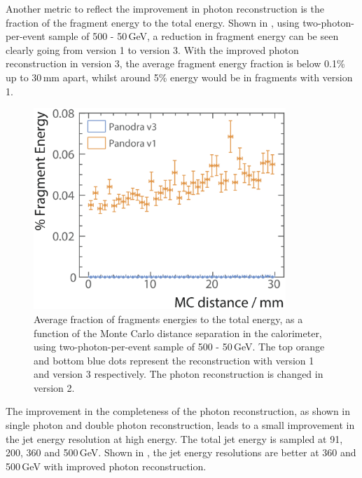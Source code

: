 Another metric to reflect the improvement in photon reconstruction is the fraction of the fragment energy to the total energy. Shown in , using two-photon-per-event sample of 500 - 50\,GeV, a reduction in fragment energy can be seen clearly going from \pandora version 1 to version 3. With the improved photon reconstruction in \pandora version 3, the average fragment energy fraction is below 0.1\% up to 30\,mm apart, whilst around 5\% energy would be in fragments with \pandora version 1.
\begin{figure}[tbph]
\centering
\includegraphics[width=0.85\textwidth]{photon/DoubleCompareFragEnergy2}
\caption[Average fraction fragments energies of the total energy, as a function of the MC distance separation]
{Average fraction of fragments energies to the total energy, as a function of the Monte Carlo distance separation in the calorimeter, using two-photon-per-event sample of 500 - 50\,GeV. The top orange and bottom blue dots represent the reconstruction with \pandora version 1 and version 3 respectively. The photon reconstruction is changed in \pandora version 2.}
\label{fig:photonDoubleFragEnergy}
\end{figure}




The improvement in the completeness of the photon reconstruction, as shown in single photon and double photon reconstruction, leads to a small improvement in the jet energy resolution at high energy. The total jet energy is sampled at 91, 200, 360 and 500\,GeV. Shown in , the jet energy resolutions are better at 360 and 500\,GeV with improved photon reconstruction. 




